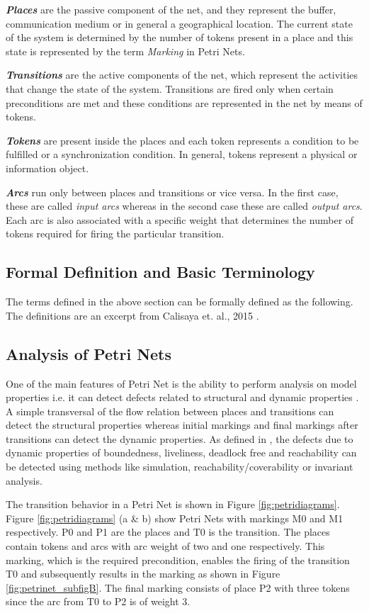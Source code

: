 \textbf{\textit{Places}} are the passive component of the net, and they represent the buffer, communication medium or in general a geographical location. The current state of the system is determined by the number of tokens present in a place and this state is represented by the term \textit{Marking} in Petri Nets.

\textbf{\textit{Transitions}} are the active components of the net, which represent the activities that change the state of the system. Transitions are fired only when certain preconditions are met and these conditions are represented in the net by means of tokens.

\textbf{\textit{Tokens}} are present inside the places and each token represents a condition to be fulfilled or a synchronization condition. In general, tokens represent a physical or information object.

\textbf{\textit{Arcs}} run only between places and transitions or vice versa. In the first case, these are called \textit{input arcs} whereas in the second case these are called \textit{output arcs}. Each arc is also associated with a specific weight that determines the number of tokens required for firing the particular transition.

\subsection{Formal Definition and Basic Terminology}
The terms defined in the above section can be formally defined as the following. The definitions are an excerpt from Calisaya et. al., 2015 \cite{calisaya2016analysis}.

\subsection{Analysis of Petri Nets}
One of the main features of Petri Net is the ability to perform analysis on model properties i.e. it can detect defects related to structural and dynamic properties \cite{murata1989petri}. A simple transversal of the flow relation between places and transitions can detect the structural properties whereas initial markings and final markings after transitions can detect the dynamic properties. As defined in \cite{reisig2012petri}, the defects due to dynamic properties of boundedness, liveliness, deadlock free and reachability can be detected using methods like simulation, reachability/coverability or invariant analysis.

 The transition behavior in a Petri Net is shown in Figure \ref{fig:petridiagrams}. Figure \ref{fig:petridiagrams} (a \& b) show Petri Nets with markings M0 and M1 respectively.  P0 and P1 are the places and T0 is the transition. The places contain tokens and arcs with arc weight of two and one respectively. This marking, which is the required precondition, enables the firing of the transition T0 and subsequently results in the marking as shown in Figure  \ref{fig:petrinet_subfigB}.  The final marking consists of place P2 with three tokens since the arc from T0 to P2 is of weight 3. 

